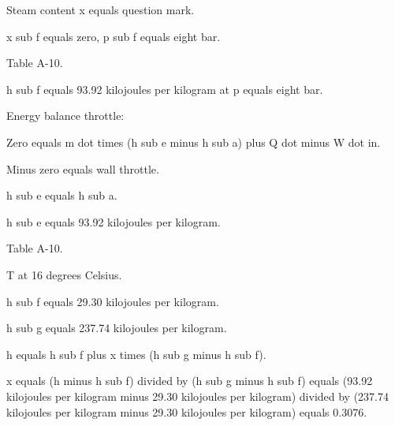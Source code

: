 Steam content x equals question mark.

x sub f equals zero, p sub f equals eight bar.

Table A-10.

h sub f equals 93.92 kilojoules per kilogram at p equals eight bar.

Energy balance throttle:

Zero equals m dot times (h sub e minus h sub a) plus Q dot minus W dot in.

Minus zero equals wall throttle.

h sub e equals h sub a.

h sub e equals 93.92 kilojoules per kilogram.

Table A-10.

T at 16 degrees Celsius.

h sub f equals 29.30 kilojoules per kilogram.

h sub g equals 237.74 kilojoules per kilogram.

h equals h sub f plus x times (h sub g minus h sub f).

x equals (h minus h sub f) divided by (h sub g minus h sub f) equals (93.92 kilojoules per kilogram minus 29.30 kilojoules per kilogram) divided by (237.74 kilojoules per kilogram minus 29.30 kilojoules per kilogram) equals 0.3076.